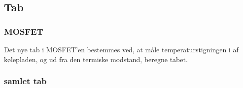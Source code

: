 
\subsection{Tab}

\subsubsection{MOSFET}
Det nye tab i MOSFET'en bestemmes ved, at måle temperaturstigningen i af kølepladen, og ud fra den termiske modstand, beregne tabet. 

\subsubsection{samlet tab}

